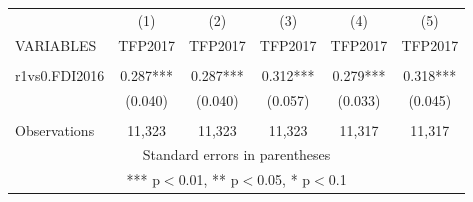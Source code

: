 \documentclass[]{article}
\begin{document}
\begin{tabular}{lccccc} \hline
 & (1) & (2) & (3) & (4) & (5) \\
VARIABLES & TFP2017 & TFP2017 & TFP2017 & TFP2017 & TFP2017 \\ \hline
 &  &  &  &  &  \\
r1vs0.FDI2016 & 0.287*** & 0.287*** & 0.312*** & 0.279*** & 0.318*** \\
 & (0.040) & (0.040) & (0.057) & (0.033) & (0.045) \\
 &  &  &  &  &  \\
 Observations & 11,323 & 11,323 & 11,323 & 11,317 & 11,317 \\ \hline
\multicolumn{6}{c}{ Standard errors in parentheses} \\
\multicolumn{6}{c}{ *** p$<$0.01, ** p$<$0.05, * p$<$0.1} \\
\end{tabular}
\end{document}
